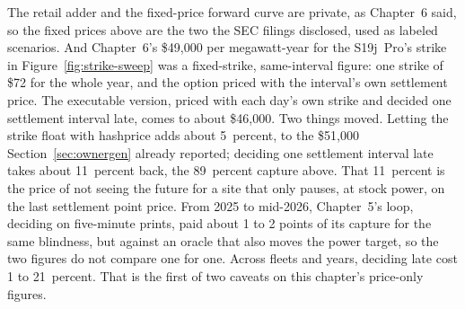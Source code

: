 The retail adder and the fixed-price forward curve are private, as Chapter~6 said, so the fixed prices above are the two the SEC filings disclosed, used as labeled scenarios. And Chapter~6's \$49,000 per megawatt-year for the S19j~Pro's strike in Figure~\ref{fig:strike-sweep} was a fixed-strike, same-interval figure: one strike of \$72 for the whole year, and the option priced with the interval's own settlement price. The executable version, priced with each day's own strike and decided one settlement interval late, comes to about \$46,000. Two things moved. Letting the strike float with hashprice adds about 5~percent, to the \$51,000 Section~\ref{sec:ownergen} already reported; deciding one settlement interval late takes about 11~percent back, the 89~percent capture above. %
That 11~percent is the price of not seeing the future for a site that only pauses, at stock power, on the last settlement point price. From 2025 to mid-2026, Chapter~5's loop, deciding on five-minute prints, paid about 1 to 2 points of its capture for the same blindness, but against an oracle that also moves the power target, so the two figures do not compare one for one. %
Across fleets and years, deciding late cost 1 to 21~percent. That is the first of two caveats on this chapter's price-only figures. %

